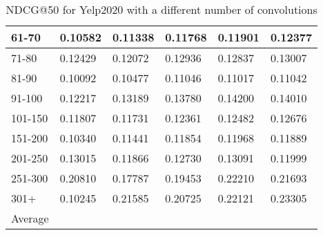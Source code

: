 \begin{table*}[]
\begin{tabular}{|l|l|l|l|l|l|}
    61-70   & 0.10582                    & 0.11338                    & 0.11768                    & 0.11901                    & 0.12377                           \\ \hline
    71-80   & 0.12429                    & 0.12072                    & 0.12936                    & 0.12837                    & 0.13007                           \\ \hline
    81-90   & 0.10092                    & 0.10477                    & 0.11046                    & 0.11017                    & 0.11042                           \\ \hline
    91-100  & 0.12217                    & 0.13189                    & 0.13780                    & 0.14200                    & 0.14010                           \\ \hline
    101-150 & 0.11807                    & 0.11731                    & 0.12361                    & 0.12482                    & 0.12676                           \\ \hline
    151-200 & 0.10340                    & 0.11441                    & 0.11854                    & 0.11968                    & 0.11889                           \\ \hline
    201-250 & 0.13015                    & 0.11866                    & 0.12730                    & 0.13091                    & 0.11999                           \\ \hline
    251-300 & 0.20810                    & 0.17787                    & 0.19453                    & 0.22210                    & 0.21693                           \\ \hline
    301+    & 0.10245                    & 0.21585                    & 0.20725                    & 0.22121                    & 0.23305                           \\ \hline
    Average &                            &                            &                            &                            &                                   \\ \hline
    \end{tabular}
    \caption{NDCG@50 for Yelp2020 with a different number of convolutions}
    \label{tab:yelp2020-con-evaluation}
\end{table*}

